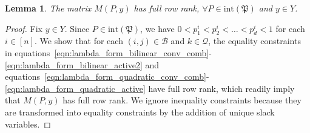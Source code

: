 \documentclass{article}
\newtheorem{lemma}[theorem]{Lemma}
\begin{document}
\begin{lemma}
\label{lem:fullrank}
The matrix $M(P, y)$ has full row rank, $\forall P \in \text{int}(\mathfrak{P})$ and $y \in Y$.
\end{lemma}
\begin{proof}
Fix $y \in Y$.
Since $P \in \text{int}(\mathfrak{P})$, we have $0 < p^i_1 < p^i_2 < \dots < p^i_d < 1$ for each $i \in [n]$.
We show that for each $(i,j) \in \mathcal{B}$ and $k \in \mathcal{Q}$, the equality constraints in equations~\eqref{eqn:lambda_form_bilinear_conv_comb}-\eqref{eqn:lambda_form_bilinear_active2} and equations~\eqref{eqn:lambda_form_quadratic_conv_comb}-\eqref{eqn:lambda_form_quadratic_active} have full row rank, which readily imply that $M(P,y)$ has full row rank.
We ignore inequality constraints because they are transformed into equality constraints by the addition of unique slack variables.


\end{proof}
\end{document}
